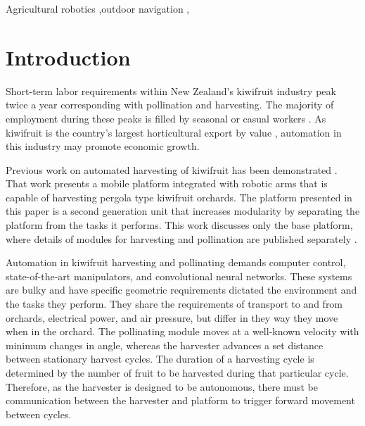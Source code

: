 \documentclass[preprint,authoryear,12pt]{elsarticle}
\begin{document}
\begin{frontmatter}
\begin{keyword}

    Agricultural robotics \sep outdoor navigation \sep
\end{keyword}

\end{frontmatter}


\section{Introduction}
\label{sect:intro}
    Short-term labor requirements within New Zealand's kiwifruit industry peak twice a year corresponding with pollination and harvesting.
    The majority of employment during these peaks is filled by seasonal or casual workers \citep{Timmins2009}.
    As kiwifruit is the country's largest horticultural export by value \citep{StatisticsNewZealand2015}, automation in this industry may promote economic growth.

    Previous work on automated harvesting of kiwifruit has been demonstrated \citep{Scarfe2012,scarfe2009}.
    That work presents a mobile platform integrated with robotic arms that is capable of harvesting pergola type kiwifruit orchards.
    The platform presented in this paper is a second generation unit that increases modularity by separating the platform from the tasks it performs.
    This work discusses only the base platform, where details of modules for harvesting and pollination are published separately \citep{williams2017,Seabright2017}.

    Automation in kiwifruit harvesting and pollinating demands computer control, state-of-the-art manipulators, and convolutional neural networks.
    These systems are bulky and have specific geometric requirements dictated the environment and the tasks they perform.
    They share the requirements of transport to and from orchards, electrical power, and air pressure, but differ in they way they move when in the orchard.
    The pollinating module moves at a well-known velocity with minimum changes in angle, whereas the harvester advances a set distance between stationary harvest cycles.
    The duration of a harvesting cycle is determined by the number of fruit to be harvested during that particular cycle.
    Therefore, as the harvester is designed to be autonomous, there must be communication between the harvester and platform to trigger forward movement between cycles.
\end{document}
